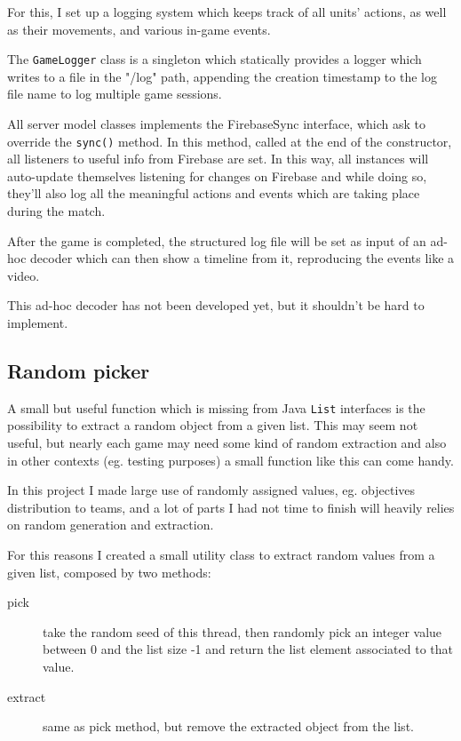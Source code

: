 			For this, I set up a logging system which keeps track of all units' actions, as well as their movements, and various in-game events.
			
			The \lstinline|GameLogger| class is a singleton which statically provides a logger which writes to a file in the "/log" path, appending the creation timestamp to the log file name to log multiple game sessions.
			
			All server model classes implements the FirebaseSync interface, which ask to override the \lstinline|sync()| method.
			In this method, called at the end of the constructor, all listeners to useful info from Firebase are set.
			In this way, all instances will auto-update themselves listening for changes on Firebase and while doing so, they'll also log all the meaningful actions and events which are taking place during the match.
			
			After the game is completed, the structured log file will be set as input of an ad-hoc decoder which can then show a timeline from it, reproducing the events like a video.
			
			This ad-hoc decoder has not been developed yet, but it shouldn't be hard to implement. 
		
		\subsection{Random picker}\label{focus:picker}
		
			
			
			A small but useful function which is missing from Java \lstinline|List| interfaces is the possibility to extract a random object from a given list.
			This may seem not useful, but nearly each game may need some kind of random extraction and also in other contexts (eg. testing purposes) a small function like this can come handy.
			
			In this project I made large use of randomly assigned values, eg. objectives distribution to teams, and a lot of parts I had not time to finish will heavily relies on random generation and extraction.
			
			For this reasons I created a small utility class to extract random values from a given list, composed by two methods:
			\begin{description}
				\item[pick] take the random seed of this thread, then randomly pick an integer value between 0 and the list size -1 and return the list element associated to that value. 
				\item[extract] same as pick method, but remove the extracted object from the list.
			\end{description}
		

